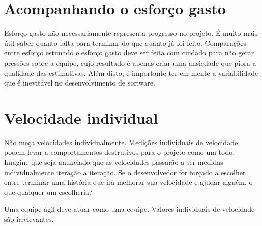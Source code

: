 \documentclass[a4paper,abntfigtabnum,noindentfirst]{abnt}
\begin{document}
\section{Acompanhando o esforço gasto}

Esforço gasto não necessariamente representa progresso no projeto. É muito mais útil saber quanto falta para terminar do que quanto já foi feito. Comparações entre esforço estimado e esforço gasto deve ser feita com cuidado para não gerar pressões sobre a equipe, cujo resultado é apenas criar uma ansiedade que piora a qualidade das estimativas. Além disto, é importante ter em mente a variabilidade que é inevitável no desenvolvimento de software.


\section{Velocidade individual}

Não meça velocidades individualmente. Medições individuais de velocidade podem levar a comportamentos destrutivos para o projeto como um todo. Imagine que seja anunciado que as velocidades passarão a ser medidas individualmente iteração a iteração. Se o desenvolvedor for forçado a escolher entre terminar uma história que irá melhorar sua velocidade e ajudar alguém, o que qualquer um escolheria? 

Uma equipe ágil deve atuar como uma equipe. Valores individuais de velocidade são irrelevantes.
\end{document}
